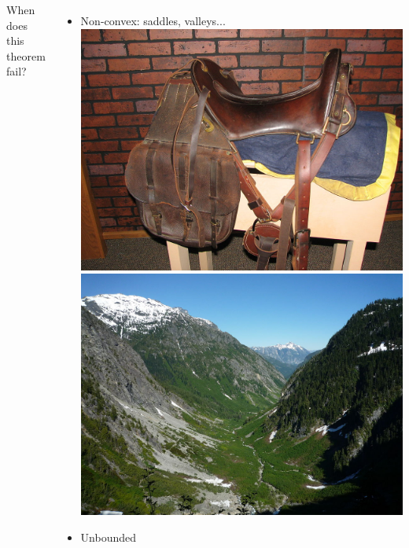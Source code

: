 \documentclass{beamer}
\begin{document}
\begin{frame}
\begin{columns}
When does this theorem fail?
\begin{itemize}
\item Non-convex: saddles, valleys... 
\includegraphics[scale = 0.12]{figures/1024px-McCellan_Saddle_Fort_Kearny_2006_C.jpg}
\vspace{3}
\includegraphics[scale = 0.12]{figures/1024px-Stehekin_River_Valley.jpg}
\item Unbounded
\end{itemize}

\end{columns}

\end{frame}

\end{document}

